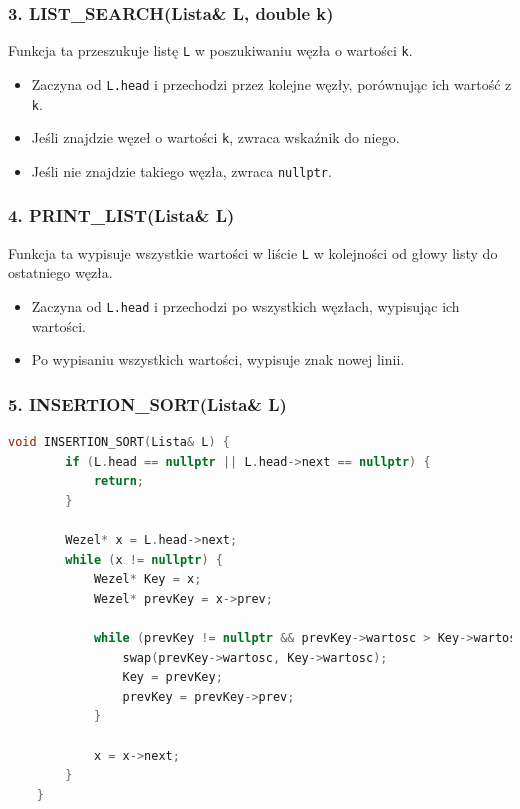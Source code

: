 \documentclass{article}
\begin{document}
			\subsubsection*{3. LIST\_SEARCH(Lista\& L, double k)}
			
			Funkcja ta przeszukuje listę \texttt{L} w poszukiwaniu węzła o wartości \texttt{k}.
			\begin{itemize}
				\item Zaczyna od \texttt{L.head} i przechodzi przez kolejne węzły, porównując ich wartość z \texttt{k}.
				\item Jeśli znajdzie węzeł o wartości \texttt{k}, zwraca wskaźnik do niego.
				\item Jeśli nie znajdzie takiego węzła, zwraca \texttt{nullptr}.
			\end{itemize}
			
			\subsubsection*{4. PRINT\_LIST(Lista\& L)}
			
			Funkcja ta wypisuje wszystkie wartości w liście \texttt{L} w kolejności od głowy listy do ostatniego węzła.
			\begin{itemize}
				\item Zaczyna od \texttt{L.head} i przechodzi po wszystkich węzłach, wypisując ich wartości.
				\item Po wypisaniu wszystkich wartości, wypisuje znak nowej linii.
			\end{itemize}
			
			\subsubsection*{5. INSERTION\_SORT(Lista\& L)}
			\begin{lstlisting}[language=C++, tabsize=3] 
	void INSERTION_SORT(Lista& L) {
		if (L.head == nullptr || L.head->next == nullptr) {
			return; 
		}
		
		Wezel* x = L.head->next; 
		while (x != nullptr) {
			Wezel* Key = x;
			Wezel* prevKey = x->prev;
			
			while (prevKey != nullptr && prevKey->wartosc > Key->wartosc) {
				swap(prevKey->wartosc, Key->wartosc);
				Key = prevKey;
				prevKey = prevKey->prev;
			}
			
			x = x->next;
		}
	}
			\end{lstlisting}
			
\end{document}
